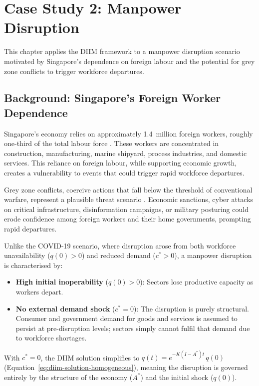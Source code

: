 \chapter{Case Study 2: Manpower Disruption}

This chapter applies the DIIM framework to a manpower disruption scenario motivated by Singapore's dependence on foreign labour and the potential for grey zone conflicts to trigger workforce departures.

\section{Background: Singapore's Foreign Worker Dependence}

Singapore's economy relies on approximately 1.4~million foreign workers, roughly one-third of the total labour force \cite{MOM2023ForeignWorkforce}. These workers are concentrated in construction, manufacturing, marine shipyard, process industries, and domestic services. This reliance on foreign labour, while supporting economic growth, creates a vulnerability to events that could trigger rapid workforce departures.

Grey zone conflicts, coercive actions that fall below the threshold of conventional warfare, represent a plausible threat scenario \cite{MINDEF2020Factsheet}. Economic sanctions, cyber attacks on critical infrastructure, disinformation campaigns, or military posturing could erode confidence among foreign workers and their home governments, prompting rapid departures.

Unlike the COVID-19 scenario, where disruption arose from both workforce unavailability ($q(0) > 0$) and reduced demand ($c^{*} > 0$), a manpower disruption is characterised by:

\begin{itemize}
    \item \textbf{High initial inoperability} ($q(0) > 0$): Sectors lose productive capacity as workers depart.
    \item \textbf{No external demand shock} ($c^* = 0$): The disruption is purely structural. Consumer and government demand for goods and services is assumed to persist at pre-disruption levels; sectors simply cannot fulfil that demand due to workforce shortages.
\end{itemize}

With $c^* = 0$, the DIIM solution simplifies to $q(t) = e^{-K(I-A^{*})t}\, q(0)$ (Equation~\eqref{eq:diim-solution-homogeneous}), meaning the disruption is governed entirely by the structure of the economy ($A^{*}$) and the initial shock ($q(0)$).


